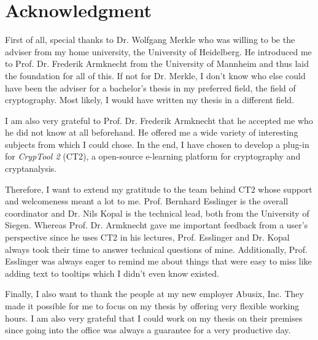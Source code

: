 
\section*{Acknowledgment}

First of all, special thanks to Dr. Wolfgang Merkle who was willing to be the adviser from my home university, the University of Heidelberg. He introduced me to Prof. Dr. Frederik Armknecht from the University of Mannheim and thus laid the foundation for all of this. If not for Dr. Merkle, I don't know who else could have been the adviser for a bachelor's thesis in my preferred field, the field of cryptography. Most likely, I would have written my thesis in a different field.

\medskip
\noindent
I am also very grateful to Prof. Dr. Frederik Armknecht that he accepted me who he did not know at all beforehand. He offered me a wide variety of interesting subjects from which I could chose. In the end, I have chosen to develop a plug-in for \textit{CrypTool 2} (CT2), a open-source e-learning platform for cryptography and cryptanalysis.

\medskip
\noindent
Therefore, I want to extend my gratitude to the team behind CT2 whose support and welcomeness meant a lot to me. Prof. Bernhard Esslinger is the overall coordinator and Dr. Nils Kopal is the technical lead, both from the University of Siegen.
Whereas Prof. Dr. Armknecht gave me important feedback from a user's perspective since he uses CT2 in his lectures, Prof. Esslinger and Dr. Kopal always took their time to answer technical questions of mine. Additionally, Prof. Esslinger was always eager to remind me about things that were easy to miss like adding text to tooltips which I didn't even know existed. 

\medskip
\noindent
Finally, I also want to thank the people at my new employer Abusix, Inc. They made it possible for me to focus on my thesis by offering very flexible working hours. I am also very grateful that I could work on my thesis on their premises since going into the office was always a guarantee for a very productive day.